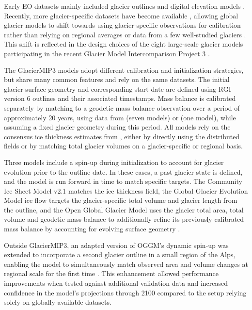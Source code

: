 \documentclass[journal abbreviation, manuscript]{copernicus}
\begin{document}
Early EO datasets mainly included glacier outlines \citep[e.g.,][]{RGI, RGI7} and digital elevation models \citep[e.g.,][]{COPDEM, NASADEM}. Recently, more glacier-specific datasets have become available \citep[e.g.,][]{Hugonnet2021, Millan2022}, allowing global glacier models to shift towards using glacier-specific observations for calibration rather than relying on regional averages or data from a few well-studied glaciers \citep{Zekollari2024,Marzeion2012}. This shift is reflected in the design choices of the eight large-scale glacier models participating in the recent Glacier Model Intercomparison Project 3 \citep[GlacierMIP3;][]{Zekollari2025}.

The GlacierMIP3 models adopt different calibration and initialization strategies, but share many common features and rely on the same datasets. The initial glacier surface geometry and corresponding start date are defined using RGI version 6 outlines \citep{RGI} and their associated timestamps. Mass balance is calibrated separately by matching to a geodetic mass balance observation over a period of approximately 20 years, using data from \citet{Hugonnet2021} (seven models) or \citet{Shean2020} (one model), while assuming a fixed glacier geometry during this period. All models rely on the consensus ice thickness estimates from \citet{Farinotti2019}, either by directly using the distributed fields or by matching total glacier volumes on a glacier-specific or regional basis.

Three models include a spin-up during initialization to account for glacier evolution prior to the outline date. In these cases, a past glacier state is defined, and the model is run forward in time to match specific targets. The Community Ice Sheet Model v2.1 \citep[CISM2;][]{Lipscomb2019} matches the ice thickness field, the Global Glacier Evolution Model ice flow \citep[GloGEMflow;][]{Zekollari2019} targets the glacier-specific total volume and glacier length from the outline, and the Open Global Glacier Model \citep[OGGM;][]{Maussion2019} uses the glacier total area, total volume and geodetic mass balance to additionally refine its previously calibrated mass balance by accounting for evolving surface geometry \citep{Aguayo2024}.

Outside GlacierMIP3, an adapted version of OGGM’s dynamic spin-up was extended to incorporate a second glacier outline in a small region of the Alps, enabling the model to simultaneously match observed area and volume changes at regional scale for the first time \citep{Hartl2024}. This enhancement allowed performance improvements when tested against additional validation data and increased confidence in the model’s projections through 2100 compared to the setup relying solely on globally available datasets.
\end{document}
